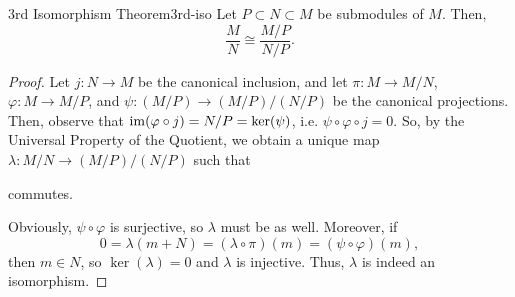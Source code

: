 \begin{theorem}{3rd Isomorphism Theorem}{3rd-iso}
	Let $P \subset N \subset M$ be submodules of $M$.
	Then,
	\[
		\frac{M}{N} \cong \frac{M / P}{N / P}.
	\]
\end{theorem}
\begin{proof}
	Let $j : N \to M$ be the canonical inclusion, and let $\pi : M \to M / N$, $\varphi : M \to M / P$, and $\psi : (M / P) \to (M / P) / (N / P)$ be the canonical projections.
	Then, observe that $\operatorname{im}(\varphi \circ j) = N / P = \ker(\psi)$, i.e. $\psi \circ \varphi \circ j = 0$.
	So, by the Universal Property of the Quotient, we obtain a unique map $\lambda : M / N \to (M / P) / (N / P)$ such that
	\begin{figure}[H]
		\centering
	\end{figure}
	commutes.

	Obviously, $\psi \circ \varphi$ is surjective, so $\lambda$ must be as well.
	Moreover, if
	\[
		0 = \lambda(m + N) = (\lambda \circ \pi)(m) = (\psi \circ \varphi)(m),
	\]
	then $m \in N$, so $\ker(\lambda) = 0$ and $\lambda$ is injective.
	Thus, $\lambda$ is indeed an isomorphism.
\end{proof}
